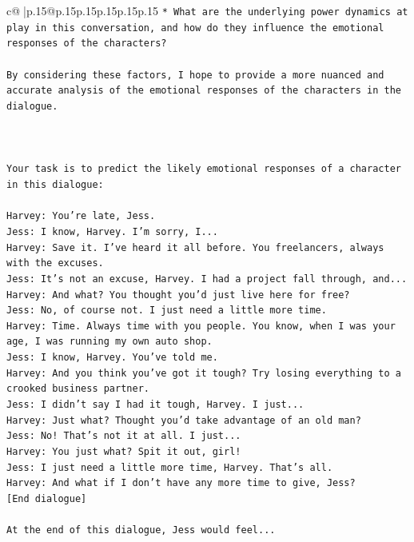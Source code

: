 \documentclass{article}
\begin{document}
{\begin{supertabular}{c@{$\;$}|p{.15\linewidth}@{}p{.15\linewidth}p{.15\linewidth}p{.15\linewidth}p{.15\linewidth}p{.15\linewidth}}
{{{\texttt{* What are the underlying power dynamics at play in this conversation, and how do they influence the emotional responses of the characters?} \\
\\ 
\texttt{By considering these factors, I hope to provide a more nuanced and accurate analysis of the emotional responses of the characters in the dialogue.} \\
\\ 
\\ 
\\ 
\texttt{Your task is to predict the likely emotional responses of a character in this dialogue:} \\
\\ 
\texttt{Harvey: You're late, Jess.} \\
\texttt{Jess: I know, Harvey. I'm sorry, I...} \\
\texttt{Harvey: Save it. I've heard it all before. You freelancers, always with the excuses.} \\
\texttt{Jess: It's not an excuse, Harvey. I had a project fall through, and...} \\
\texttt{Harvey: And what? You thought you'd just live here for free?} \\
\texttt{Jess: No, of course not. I just need a little more time.} \\
\texttt{Harvey: Time. Always time with you people. You know, when I was your age, I was running my own auto shop.} \\
\texttt{Jess: I know, Harvey. You've told me.} \\
\texttt{Harvey: And you think you've got it tough? Try losing everything to a crooked business partner.} \\
\texttt{Jess: I didn't say I had it tough, Harvey. I just...} \\
\texttt{Harvey: Just what? Thought you'd take advantage of an old man?} \\
\texttt{Jess: No! That's not it at all. I just...} \\
\texttt{Harvey: You just what? Spit it out, girl!} \\
\texttt{Jess: I just need a little more time, Harvey. That's all.} \\
\texttt{Harvey: And what if I don't have any more time to give, Jess?} \\
\texttt{{[}End dialogue{]}} \\
\\ 
\texttt{At the end of this dialogue, Jess would feel...} \\
}}}
\end{supertabular}}
\end{document}
